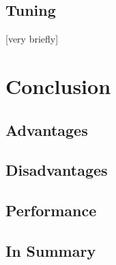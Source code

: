 \documentclass[titlepage, a4paper, 11pt]{scrartcl}
\begin{document}


        \subsection{Tuning}

        [very briefly]


    \section{Conclusion}

        \subsection{Advantages}


        \subsection{Disadvantages}


        \subsection{Performance}
    


        \subsection{In Summary}

      

            
    
\end{document}
